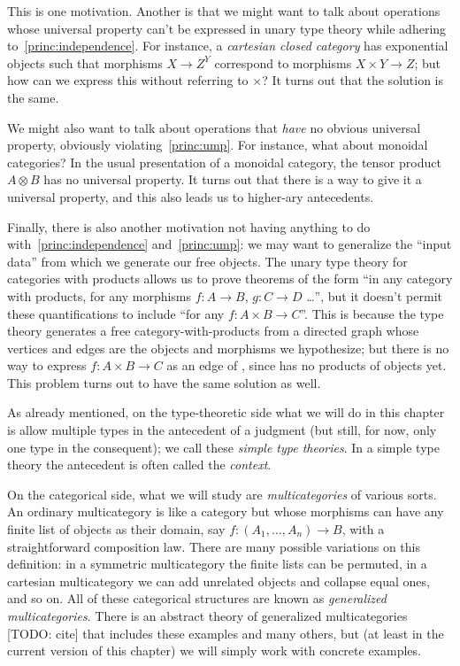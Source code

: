 \documentclass{book}
\begin{document}
This is one motivation.
Another is that we might want to talk about operations whose universal property can't be expressed in unary type theory while adhering to~\eqref{princ:independence}.
For instance, a \emph{cartesian closed category} has exponential objects such that morphisms $X\to Z^Y$ correspond to morphisms $X\times Y\to Z$; but how can we express this without referring to $\times$?
It turns out that the solution is the same.

We might also want to talk about operations that \emph{have} no obvious universal property, obviously violating~\eqref{princ:ump}.
For instance, what about monoidal categories?
In the usual presentation of a monoidal category, the tensor product $A\otimes B$ has no universal property.
It turns out that there is a way to give it a universal property, and this also leads us to higher-ary antecedents.

Finally, there is also another motivation not having anything to do with~\eqref{princ:independence} and~\eqref{princ:ump}: we may want to generalize the ``input data'' \cG from which we generate our free objects.
The unary type theory for categories with products allows us to prove theorems of the form ``in any category with products, for any morphisms $f:A\to B$, $g:C\to D$ \dots'', but it doesn't permit these quantifications to include ``for any $f:A\times B\to C$''.
This is because the type theory generates a free category-with-products from a directed graph \cG whose vertices and edges are the objects and morphisms we hypothesize; but there is no way to express $f:A\times B\to C$ as an edge of \cG, since \cG has no products of objects yet.
This problem turns out to have the same solution as well.

As already mentioned, on the type-theoretic side what we will do in this chapter is allow multiple types in the antecedent of a judgment (but still, for now, only one type in the consequent); we call these \emph{simple type theories}.
In a simple type theory the antecedent is often called the \emph{context}.

On the categorical side, what we will study are \emph{multicategories} of various sorts.
An ordinary multicategory is like a category but whose morphisms can have any finite list of objects as their domain, say $f:(A_1,\dots,A_n) \to B$, with a straightforward composition law.
There are many possible variations on this definition: in a symmetric multicategory the finite lists can be permuted, in a cartesian multicategory we can add unrelated objects and collapse equal ones, and so on.
All of these categorical structures are known as \emph{generalized multicategories}.
There is an abstract theory of generalized multicategories [TODO: cite] that includes these examples and many others, but (at least in the current version of this chapter) we will simply work with concrete examples.
\end{document}
